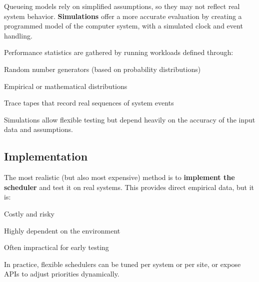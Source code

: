Queueing models rely on simplified assumptions, so they may not reflect real system behavior.  
\textbf{Simulations} offer a more accurate evaluation by creating a programmed model of the computer system, with a simulated clock and event handling.

Performance statistics are gathered by running workloads defined through:
\begin{compactitemize}
    \item Random number generators (based on probability distributions)
    \item Empirical or mathematical distributions
    \item Trace tapes that record real sequences of system events
\end{compactitemize}

Simulations allow flexible testing but depend heavily on the accuracy of the input data and assumptions.

\subsection{Implementation}

The most realistic (but also most expensive) method is to \textbf{implement the scheduler} and test it on real systems.  
This provides direct empirical data, but it is:
\begin{compactitemize}
    \item Costly and risky
    \item Highly dependent on the environment
    \item Often impractical for early testing
\end{compactitemize}

In practice, flexible schedulers can be tuned per system or per site, or expose APIs to adjust priorities dynamically.
